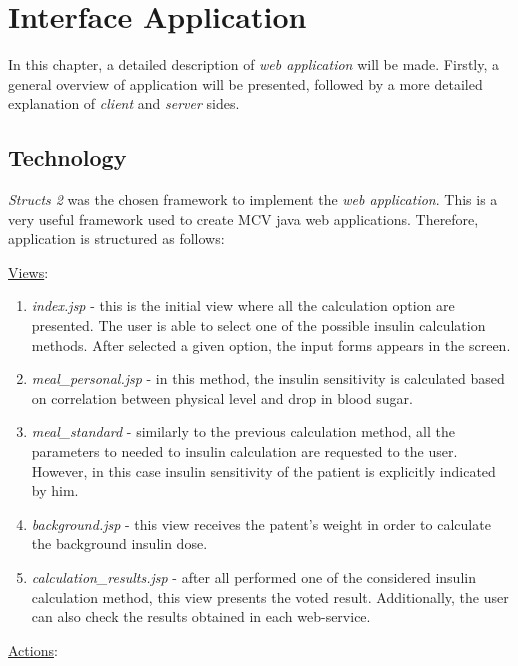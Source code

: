 \chapter{Interface Application}
\label{interface_application}

    In this chapter, a detailed description of \emph{web application} will be made. Firstly, a general overview of application will be presented, followed by a more detailed explanation of \emph{client} and \emph{server} sides.

\section{Technology}

    \emph{Structs 2} was the chosen framework to implement the \emph{web application}. This is a very useful framework used to create MCV java web applications. Therefore, application is structured as follows:
    
    \underline{Views}:
    
    \begin{enumerate}
    \item \emph{index.jsp} - this is the initial view where all the calculation option are presented. The user is able to select one of the possible insulin calculation methods. After selected a given option, the input forms appears in the screen.
    \item \emph{meal\_personal.jsp} - in this method, the insulin sensitivity is calculated based on correlation between physical level and drop in blood sugar.
    \item \emph{meal\_standard} - similarly to the previous calculation method, all the parameters to needed to insulin calculation are requested to the user. However, in this case insulin sensitivity of the patient is explicitly indicated by him.
    \item \emph{background.jsp} - this view receives the patent's weight in order to calculate the background insulin dose.
    \item \emph{calculation\_results.jsp} - after all performed one of the considered insulin calculation method, this view presents the voted result. Additionally, the user can also check the results obtained in each web-service.
    
    
    
    \end{enumerate}
    
    \underline{Actions}:
    
